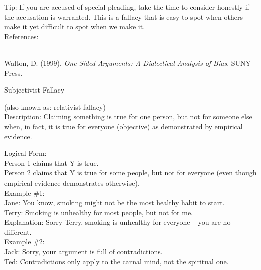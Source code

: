 \documentclass[a4paper,12pt,single,pdftex]{scrbook}
\begin{document}
{    
      Tip: If you are accused of special pleading, take the time to consider honestly if the accusation is warranted.  This is a fallacy that is easy to spot when others make it yet difficult to spot when we make it.
    \\

    References:

    
      
        
      \\

      
        
          Walton, D. (1999). {\it One-Sided Arguments: A Dialectical Analysis of Bias}. SUNY Press.
        
      
    
  }


Subjectivist Fallacy
    
      (also known as: relativist fallacy)
    \\

  
    Description: Claiming something is true for one person, but not for someone else when, in fact, it is true for everyone (objective) as demonstrated by empirical evidence.

    
      Logical Form:
    \\

    
      Person 1 claims that Y is true.
    \\

    
      Person 2 claims that Y is true for some people, but not for everyone (even though empirical evidence demonstrates otherwise).
    \\

    
      Example \#1:
    \\

    
      Jane: You know, smoking might not be the most healthy habit to start.
    \\

    
      Terry: Smoking is unhealthy for most people, but not for me.
    \\

    
      Explanation: Sorry Terry, smoking is unhealthy for everyone -- you are no different.
    \\

    
      Example \#2:
    \\

    
      Jack: Sorry, your argument is full of contradictions.
    \\

    
      Ted: Contradictions only apply to the carnal mind, not the spiritual one.
    \\
\end{document}
